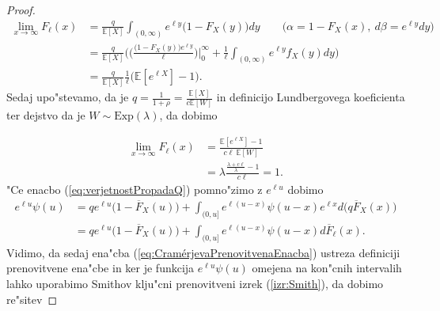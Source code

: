 \documentclass[12pt, a4paper, reqno]{amsart}
\theoremstyle{definition}
\theoremstyle{plain}
\newcommand{\E}{\mathbb{E}}
\newcommand{\1}{\mathds{1}}
\begin{document}
\begin{proof}
                \begin{align*}
                    \lim_{x\to\infty}F_\ell(x) &= \frac{q}{\E\left[X\right]}\int_{(0, \infty)}e^{\ell y} \bigl(1 - F_X(y)\bigr)dy \qquad \bigl(\alpha = 1 - F_X(x), \ d\beta = e^{\ell y}dy\bigr)\\
                                               &= \frac{q}{\E\left[X\right]}\biggl(\biggl(\frac{\bigl(1 - F_X(y)\bigr)e^{\ell y}}{\ell}\biggr)\Big|_{0}^{\infty} + \frac{1}{\ell}\int_{(0, \infty)}e^{\ell y}f_X(y)dy\biggr) \\
                                               &= \frac{q}{\E\left[X\right]}\frac{1}{\ell}\biggl(\E\left[e^{\ell X}\right] - 1\biggr).
                \end{align*}
                Sedaj upo"stevamo, da je $q = \frac{1}{1 + \rho} = \frac{\E\left[X\right]}{c\E\left[W\right]}$ in 
                definicijo Lundbergovega koeficienta ter dejstvo da je $W\sim\text{Exp}(\lambda)$, da dobimo

                \begin{align*}
                    \lim_{x\to\infty}F_\ell(x)  &= \frac{\E\left[e^{\ell X}\right] - 1}{c\ell\ \E\left[W\right]}\\
                                                &= \lambda\frac{\frac{\lambda + c\ell}{\lambda} - 1}{c\ell} = 1.
                \end{align*}
                "Ce enacbo (\ref{eq:verjetnostPropadaQ}) pomno"zimo z $e^{\ell u}$ dobimo
                \begin{align}
                    e^{\ell u}\psi(u)   &= qe^{\ell u}\bigl(1 - \overline{F}_X(u)\bigr) + \int_{(0, u]}e^{\ell (u - x)}\psi(u - x)e^{\ell x}d\bigl(q\overline{F}_X(x)\bigr) \nonumber \\
                                        &= qe^{\ell u}\bigl(1 - \overline{F}_X(u)\bigr) + \int_{(0, u]}e^{\ell (u - x)}\psi(u - x)d\overline{F}_\ell(x). \label{eq:CramérjevaPrenovitvenaEnacba}
                \end{align}
                Vidimo, da sedaj ena"cba (\ref{eq:CramérjevaPrenovitvenaEnacba}) ustreza definiciji
                prenovitvene ena"cbe in ker je funkcija $e^{\ell u}\psi(u)$ omejena na kon"cnih 
                intervalih lahko uporabimo Smithov klju"cni prenovitveni izrek (\ref{izr:Smith}), da dobimo
                re"sitev
                

\end{proof}
\end{document}
